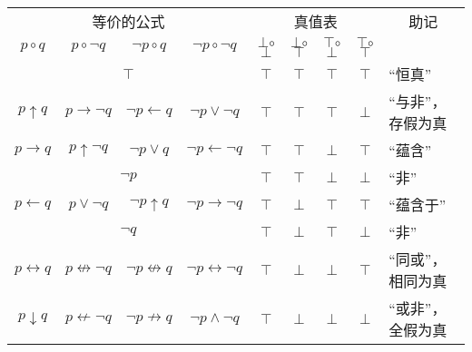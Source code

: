 \begin{table}[h!]
    \centering
    \newcommand{\F}{{\color{red}$\bot$}}
    \newcommand{\T}{{\color{blue}$\top$}}
    \newcommand{\FoF}{\F$\circ$\F}
    \newcommand{\FoT}{\F$\circ$\T}
    \newcommand{\ToF}{\T$\circ$\F}
    \newcommand{\ToT}{\T$\circ$\T}
    \begin{tabular}{c c c c c c c c l}
        \hline
        \multicolumn{4}{c}{等价的公式}                                                                                                        & \multicolumn{4}{c}{真值表} & \multicolumn{1}{c}{助记} \\
        $p\circ{}q$               & $p\circ\lnot{}q$               & $\lnot{}p\circ{}q$               & $\lnot{}p\circ\lnot{}q$               & \FoF & \FoT & \ToF & \ToT  &                          \\
        \hline
        \multicolumn{4}{c}{$\top$}                                                                                                            & \T   & \T   & \T   & \T    & ``恒真''                 \\
        $p\uparrow{}q$            & $p\to\lnot{}q$                 & $\lnot{}p\gets{}q$               & $\lnot{}p\lor\lnot{}q$                & \T   & \T   & \T   & \F    & ``与非''，存假为真       \\
        $p\to{}q$                 & $p\uparrow\lnot{}q$            & $\lnot{}p\lor{}q$                & $\lnot{}p\gets\lnot{}q$               & \T   & \T   & \F   & \T    & ``蕴含''                 \\
        \multicolumn{4}{c}{$\lnot{}p$}                                                                                                        & \T   & \T   & \F   & \F    & ``非''                   \\
        $p\gets{}q$               & $p\lor\lnot{}q$                & $\lnot{}p\uparrow{}q$            & $\lnot{}p\to\lnot{}q$                 & \T   & \F   & \T   & \T    & ``蕴含于''               \\
        \multicolumn{4}{c}{$\lnot{}q$}                                                                                                        & \T   & \F   & \T   & \F    & ``非''                   \\
        $p\leftrightarrow{}q$     & $p\not\leftrightarrow\lnot{}q$ & $\lnot{}p\not\leftrightarrow{}q$ & $\lnot{}p\leftrightarrow\lnot{}q$     & \T   & \F   & \F   & \T    & ``同或''，相同为真       \\
        $p\downarrow{}q$          & $p\not\gets\lnot{}q$           & $\lnot{}p\not\to{}q$             & $\lnot{}p\land\lnot{}q$               & \T   & \F   & \F   & \F    & ``或非''，全假为真       \\

\end{tabular}
\end{table}
